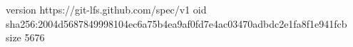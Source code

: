 version https://git-lfs.github.com/spec/v1
oid sha256:2004d5687849998104ec6a75b4ea9af0fd7e4ac03470adbdc2e1fa8f1e941fcb
size 5676
